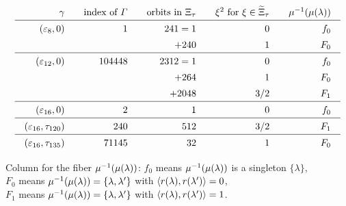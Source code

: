 \documentclass{amsart} %
\begin{document}
\begin{table}
\[
\setlength{\arraycolsep}{10pt}
\renewcommand{\arraystretch}{1.4}
\begin{array}{rrrrr}
\gamma &\textrm{index of $\vGam$} &\textrm{orbits in $\Xitau$} & \xi^2 \textrm{ for } \xi\in \tilXitau&\mu\inv(\mu(\lambda))\\
\hline 
(\vep_8, 0) &1 & 241= 1 & 0 & f_0 \\
   & & +240 & 1 & F_0 \\
\hline 
(\vep_{12}, 0) &104448 & 2312= 1 & 0 & f_0 \\
   & & +264 & 1 & F_0 \\
   & & +2048 & 3/2 & F_1 \\
 \hline 
(\vep_{16}, 0) &2& 1 & 0 & f_0 \\
\hline 
(\vep_{16}, \tau_{120}) &240& 512 & 3/2 & F_1 \\
\hline 
(\vep_{16}, \tau_{135}) &71145 & 32 & 1 & F_0 \\   
\end{array}
\]
\vskip 3mm
%
\parbox{12cm}{
Column for the fiber $\mu^{-1}(\mu(\lambda))$: 
$f_0$ means $\mu^{-1}(\mu(\lambda))$ is a singleton $\{\lambda\}$,
\\
$ F_0$ means $\mu^{-1}(\mu(\lambda))=\{\lambda, \lambda^{\prime}\}$ with $\langle r(\lambda), r(\lambda^{\prime}) \rangle=0$, 
\\
$ F_1$ means $\mu^{-1}(\mu(\lambda))=\{\lambda, \lambda^{\prime}\}$ with $\langle r(\lambda), r(\lambda^{\prime}) \rangle=1$.
}
%

\vskip 5mm
\caption{Index $[\OG(\Lplus, \PPPplus): \vGam]$ and orbit decomposition of walls}\label{table:Xis}
\end{table}

\end{document}
